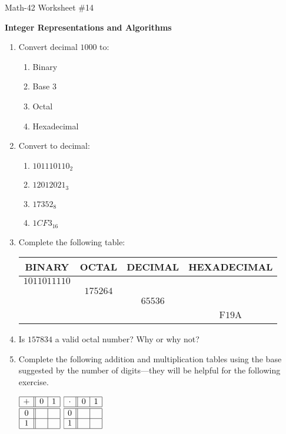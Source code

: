 \documentclass[letterpaper,12pt,fleqn]{article}
\begin{document}
\begin{center}
  \large Math-42 Worksheet \#14

  \textbf{Integer Representations and Algorithms}
\end{center}

\vspace{0.5in}

\begin{enumerate}[left=0in,itemsep=0.5in]
\item Convert decimal \(1000\) to:
  \begin{enumerate}
  \item Binary
  \item Base \(3\)
  \item Octal
  \item Hexadecimal
  \end{enumerate}

\item Convert to decimal:
  \begin{enumerate}
  \item \(101110110_2\)
  \item \(12012021_3\)
  \item \(17352_8\)
  \item \(1CF3_{16}\)
  \end{enumerate}

\item Complete the following table:
  
  \begin{tabular}{|c|c|c|c|}
    \hline
    BINARY & OCTAL & DECIMAL & HEXADECIMAL \\
    \hline
    \hline
    \(1011011110\) & & & \\
    \hline
    & \(175264\) & & \\
    \hline
    & & \(65536\) & \\
    \hline
    & & & F\(19\)A \\
    \hline
  \end{tabular}

\item Is \(157834\) a valid octal number?  Why or why not?

\item Complete the following addition and multiplication tables using the base suggested by the number of
  digits---they will be helpful for the following exercise.

  \bigskip

  \(\begin{array}{|c||c|c|}
  \hline
  + & 0 & 1 \\
  \hline
  \hline
  0 & & \\
  \hline
  1 & & \\
  \hline
  \end{array}\)
  \qquad
  \(\begin{array}{|c||c|c|}
  \hline
  \cdot & 0 & 1 \\
  \hline
  \hline
  0 & & \\
  \hline
  1 & & \\
  \hline
  \end{array}\)


\end{enumerate}
\end{document}
